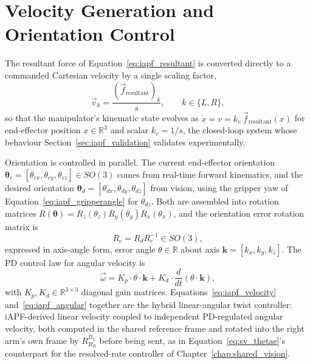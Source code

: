 \section{Velocity Generation and Orientation Control}\label{sec:iapf_velocity}

The resultant force of Equation~\eqref{eq:iapf_resultant} is converted directly to a commanded
Cartesian velocity by a single scaling factor,
\begin{equation}
\vec{v}_k = \frac{\left(\vec{f}_{\text{resultant}}\right)_k}{s}, \qquad k \in \{L, R\},
\label{eq:iapf_velocity}
\end{equation}
so that the manipulator's kinematic state evolves as $\dot{x} = v = k_v\, \vec{f}_{\text{resultant}}(x)$
for end-effector position $x \in \mathbb{R}^3$ and scalar $k_v = 1/s$, the closed-loop system whose
behaviour Section~\ref{sec:iapf_validation} validates experimentally.

Orientation is controlled in parallel. The current end-effector orientation
$\boldsymbol{\theta}_c = [\theta_{cx}, \theta_{cy}, \theta_{cz}] \in SO(3)$ comes from real-time
forward kinematics, and the desired orientation $\boldsymbol{\theta}_d = [\theta_{dx}, \theta_{dy}, \theta_{dz}]$
from vision, using the gripper yaw of Equation~\eqref{eq:iapf_gripperangle} for $\theta_{dz}$. Both
are assembled into rotation matrices $R(\boldsymbol{\theta}) = R_z(\theta_z) R_y(\theta_y) R_x(\theta_x)$,
and the orientation error rotation matrix is
\begin{equation}
R_e = R_d R_c^{-1} \in SO(3),
\label{eq:iapf_orierror}
\end{equation}
expressed in axis-angle form, error angle $\theta \in \mathbb{R}$ about axis
$\mathbf{k} = [k_x, k_y, k_z]$. The PD control law for angular velocity is
\begin{equation}
\vec{\omega} = K_p \cdot \theta \cdot \mathbf{k} + K_d \cdot \frac{d}{dt}(\theta \cdot \mathbf{k}),
\label{eq:iapf_angular}
\end{equation}
with $K_p, K_d \in \mathbb{R}^{3 \times 3}$ diagonal gain matrices. Equations~\eqref{eq:iapf_velocity}
and~\eqref{eq:iapf_angular} together are the hybrid linear-angular twist controller: iAPF-derived
linear velocity coupled to independent PD-regulated angular velocity, both computed in the shared
reference frame and rotated into the right arm's own frame by $R^{B_L}_{B_R}$ before being sent, as
in Equation~\eqref{eq:sv_thetae}'s counterpart for the resolved-rate controller of
Chapter~\ref{chap:shared_vision}.

